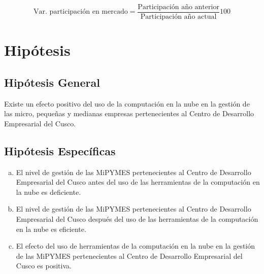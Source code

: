 \begin{equation}\label{eq:competitividad2}
    \text{Var. participación en mercado} = \frac{\text{Participación año anterior}}{\text{Participación año actual}}\text{100}
\end{equation}

\newpage
\section{Hipótesis}

\subsection{Hipótesis General}

Existe un efecto positivo del uso de la computación en la nube en la
gestión de las micro, pequeñas y medianas empresas pertenecientes al Centro de
Desarrollo Empresarial del Cusco.

\subsection{Hipótesis Específicas}
\begin{enumerate}[a., noitemsep]
    \item El nivel de gestión de las MiPYMES pertenecientes al Centro de Desarrollo
          Empresarial del Cusco antes del uso de las herramientas de la computación
          en la nube es deficiente.
    \item El nivel de gestión de las MiPYMES pertenecientes al Centro de Desarrollo
          Empresarial del Cusco después del uso de las herramientas de la computación
          en la nube es eficiente.
    \item El efecto del uso de herramientas de la computación en la nube en la
          gestión de las MiPYMES pertenecientes al Centro de Desarrollo Empresarial
          del Cusco es positiva.
\end{enumerate}

